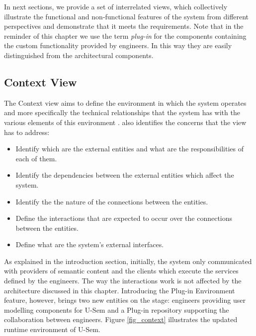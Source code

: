 In next sections, we provide a set of interrelated views, which collectively illustrate the functional and non-functional features of the system from different perspectives and demonstrate that it meets the requirements. Note that in the reminder of this chapter we use the term \textit{plug-in} for the components containing the custom functionality provided by engineers. In this way they are easily distinguished from the architectural components. 

\subsection{Context View}

The Context view aims to define the environment in which the system operates and more specifically the technical relationships that the system has with the various elements of this environment \cite{woods2009system}. \cite{woods2009system} also identifies the concerns that the view has to address:

\begin{itemize}
	\item Identify which are the external entities and what are the responsibilities of each of them.
	\item Identify the dependencies between the external entities which affect the system.
	\item Identify the the nature of the connections between the entities.
	\item Define the interactions that are expected to occur over the connections between the entities.
	\item Define what are the system's external interfaces.
\end{itemize}


As explained in the introduction section, initially, the system only communicated with providers of semantic content and the clients which execute the services defined by the engineers. The way the interactions work is not affected by the architecture discussed in this chapter. Introducing the Plug-in Environment feature, however, brings two new entities on the stage: engineers providing user modelling components for U-Sem and a Plug-in repository supporting the collaboration between engineers. Figure \ref{fig_context} illustrates the updated runtime environment of U-Sem.


